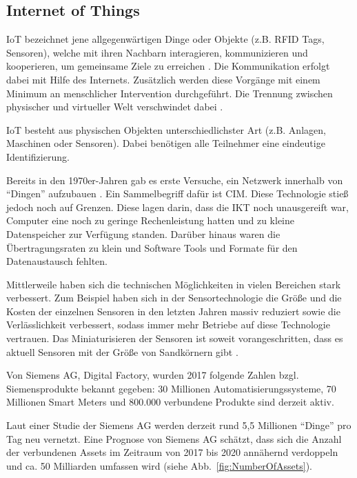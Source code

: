 \subsection{Internet of Things}
\ac{IoT} bezeichnet jene allgegenwärtigen Dinge oder Objekte (z.B. \acl{RFID} Tags, Sensoren), welche mit ihren Nachbarn interagieren, kommunizieren und kooperieren, um gemeinsame Ziele zu erreichen \parencite{batallabeyond}. Die Kommunikation erfolgt dabei mit Hilfe des Internets. Zusätzlich werden diese Vorgänge mit einem Minimum an menschlicher Intervention durchgeführt. Die Trennung zwischen physischer und virtueller Welt verschwindet dabei \parencite{vogel2017handbuch}. 

\ac{IoT} besteht aus physischen Objekten unterschiedlichster Art (z.B. Anlagen, Maschinen oder Sensoren). Dabei benötigen alle Teilnehmer eine eindeutige Identifizierung.  

Bereits in den 1970er-Jahren gab es erste Versuche, ein Netzwerk innerhalb von "`Dingen"' aufzubauen \parencite{jeschke2017industrial}. Ein Sammelbegriff dafür ist \ac{CIM}. Diese Technologie stieß jedoch noch auf Grenzen. Diese lagen darin, dass die \acl{IKT} noch unausgereift war, Computer eine noch zu geringe Rechenleistung hatten und zu kleine Datenspeicher zur Verfügung standen. Darüber hinaus waren die Übertragungsraten zu klein und Software Tools und Formate für den Datenaustausch fehlten.

Mittlerweile haben sich die technischen Möglichkeiten in vielen Bereichen stark verbessert. Zum Beispiel haben sich in der Sensortechnologie die Größe und die Kosten der einzelnen Sensoren in den letzten Jahren massiv reduziert sowie die Verlässlichkeit verbessert, sodass immer mehr Betriebe auf diese Technologie vertrauen. Das Miniaturisieren der Sensoren ist soweit vorangeschritten, dass es aktuell Sensoren mit der Größe von Sandkörnern gibt \parencite{gilchrist2016industry}.

Von Siemens AG, Digital Factory, wurden 2017 folgende Zahlen bzgl. Siemensprodukte bekannt gegeben: 30 Millionen Automatisierungssysteme, 70 Millionen Smart Meters und 800.000 verbundene Produkte sind derzeit aktiv.

Laut einer Studie der Siemens AG werden derzeit rund 5,5 Millionen "`Dinge"' pro Tag neu vernetzt. Eine Prognose von Siemens AG schätzt, dass sich die Anzahl der verbundenen Assets im Zeitraum von 2017 bis 2020 annähernd verdoppeln  und ca. 50 Milliarden umfassen wird (siehe Abb.~\ref{fig:NumberOfAssets}).

